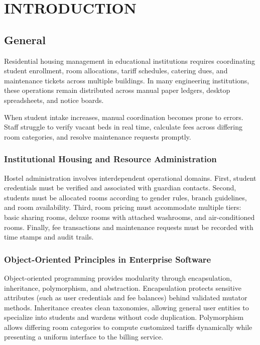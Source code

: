 \documentclass[12pt,a4paper]{report}
\begin{document}
\chapter{INTRODUCTION}

\section{General}
Residential housing management in educational institutions requires coordinating student enrollment, room allocations, tariff schedules, catering dues, and maintenance tickets across multiple buildings. In many engineering institutions, these operations remain distributed across manual paper ledgers, desktop spreadsheets, and notice boards.

When student intake increases, manual coordination becomes prone to errors. Staff struggle to verify vacant beds in real time, calculate fees across differing room categories, and resolve maintenance requests promptly.

\subsection{Institutional Housing and Resource Administration}
Hostel administration involves interdependent operational domains. First, student credentials must be verified and associated with guardian contacts. Second, students must be allocated rooms according to gender rules, branch guidelines, and room availability. Third, room pricing must accommodate multiple tiers: basic sharing rooms, deluxe rooms with attached washrooms, and air-conditioned rooms. Finally, fee transactions and maintenance requests must be recorded with time stamps and audit trails.

\subsection{Object-Oriented Principles in Enterprise Software}
Object-oriented programming provides modularity through encapsulation, inheritance, polymorphism, and abstraction. Encapsulation protects sensitive attributes (such as user credentials and fee balances) behind validated mutator methods. Inheritance creates clean taxonomies, allowing general user entities to specialize into students and wardens without code duplication. Polymorphism allows differing room categories to compute customized tariffs dynamically while presenting a uniform interface to the billing service.
\end{document}

